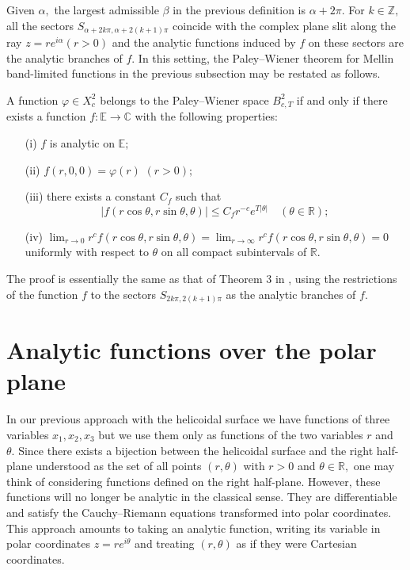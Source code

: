 \documentclass[amsmath,english,a4paper,graphicx,12pt]{article}
\begin{document}
Given $\alpha,$ the largest admissible $\beta$ in the previous definition is $\alpha + 2\pi.$
For $k\in \mathbb{Z},$ all the sectors $S_{\alpha+2k\pi,\alpha +2(k+1)\pi}$ coincide with the complex plane slit along the ray $z=r e^{i \alpha} (r>0)$ and the analytic functions induced by $f$ on these sectors are the analytic branches of $f.$
In this setting, the Paley--Wiener theorem for Mellin band-limited functions in the previous subsection may be restated as follows.
\begin{Theorem}\label{pw1}
A function $\varphi \in X^2_c$ belongs to the Paley--Wiener space $B^2_{c,T}$ if and only if there exists a function $f: \mathbb{E}\rightarrow \mathbb{C}$ with the following properties:
\begin{enumerate}
\item[(i)] $f$ is analytic on $\mathbb{E};$
\item[(ii)] $f(r,0,0)= \varphi(r)$ \quad $(r>0);$
\item[(iii)] there exists a constant $C_f$ such that
$$ |f(r\cos \theta,r\sin \theta,\theta)| \leq C_f r^{-c} e^{T|\theta|} \quad (\theta \in \mathbb{R});$$
\item[(iv)]$ \lim_{r\rightarrow 0} r^c f(r\cos \theta,r\sin \theta, \theta) = \lim_{r\rightarrow \infty} r^c f(r\cos \theta,r\sin \theta, \theta) =0$
uniformly with respect to $\theta$ on all compact subintervals of $\mathbb{R}.$
\end{enumerate}
\end{Theorem}
The proof is essentially the same as that of Theorem 3 in \cite{BBMS}, using the restrictions of the function $f$ to the sectors
$S_{2k\pi, 2(k+1)\pi}$ as the analytic branches of $f.$


\section{Analytic functions over the polar plane}

In our previous approach with the helicoidal surface we have functions of three variables $x_1, x_2, x_3$ but we use them only as functions of the 
two variables $r$ and $\theta.$ Since there exists a bijection between the helicoidal surface and the right half-plane understood as the set of 
all points $(r, \theta)$ with $r > 0$ and $\theta \in \mathbb{R},$ one may think of considering functions defined on the right half-plane. However, 
these functions will no longer be analytic in the classical sense. They are differentiable and satisfy the Cauchy--Riemann equations transformed 
into polar coordinates. This approach amounts to taking an analytic function, writing its variable in polar coordinates $z = r e^{i \theta}$ and 
treating $(r, \theta)$ as if they were Cartesian coordinates.
\end{document}
